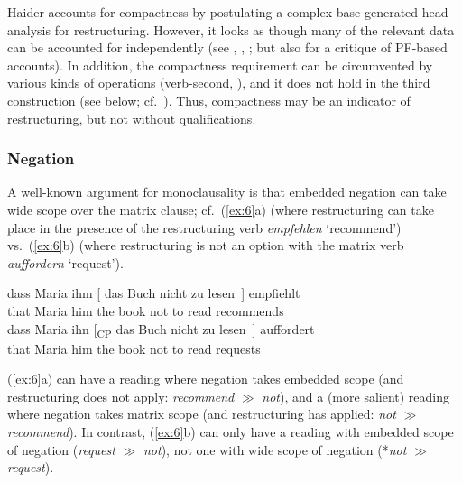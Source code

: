\documentclass[output=paper]{langsci/langscibook}
\begin{document}
\ea\label{ex:5} 
\z
\z

Haider accounts for compactness by postulating a complex base-generated head
analysis for restructuring. However, it looks as though many of the relevant
data can be accounted for independently (see \citealt{Buering&Hartmann:96},
\cite{Wurmbrand:07}, \textcite[ch.~3]{Mueller:14:buf}; but also
\cite{Haider:16:com} for a critique of PF-based accounts). In addition, the
compactness requirement can be circumvented by various kinds of 
operations (verb-second, ), and it does not hold in the third
construction (see below; cf.\  \cite{Wurmbrand:07}). Thus, compactness may be an
indicator of restructuring, but not without qualifications.


\subsubsection{\label{m6}Negation}

A well-known argument for monoclausality is that embedded negation can take
wide scope over the matrix clause; cf.\ (\ref{ex:6}a) (where restructuring can
take place in the presence of the restructuring verb {\itshape empfehlen}
\enquote*{recommend}) vs.\ (\ref{ex:6}b) (where restructuring is not an option with the
matrix verb {\itshape auffordern} \enquote*{request}).

\ea\label{ex:6} 
\ea \gll dass \label{negw3}Maria ihm [ das Buch nicht zu lesen~] empfiehlt\\
that Maria\textsubscript{\Nom} him\textsubscript{\Dat} {} the book\textsubscript{\Acc} not to read recommends\\
\ex \gll dass Maria ihn [\textsubscript{CP} das Buch nicht zu lesen~]  auffordert\\
that Maria\textsubscript{\Nom} him\textsubscript{\Acc} {} the book\textsubscript{\Acc} not to read requests\\
\z
\z

(\ref{ex:6}a) can have a reading where negation takes embedded scope
(and restructuring does not apply: {\itshape recommend} $\gg$ {\itshape not}), and a
(more salient) reading where negation takes matrix scope (and restructuring
has applied: {\itshape not} $\gg$ {\itshape recommend}). In contrast, (\ref{ex:6}b) can only have a
reading with embedded scope of negation ({\itshape request} $\gg$ {\it
  not}), not one with wide scope of negation (*{\itshape not} $\gg$ {\it
  request}).
\end{document}
